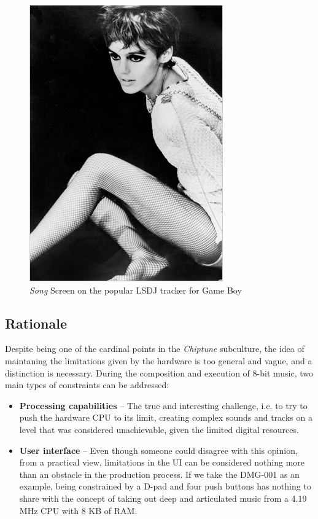 \documentclass[]{article}
\begin{document}
        \begin{figure}[h]
            \centering
            \includegraphics[width=.5\textwidth]{PLACEHOLDER.jpg} %
            \caption{\emph{Song} Screen on the popular LSDJ tracker for Game Boy \cite{KOTLINSKI2007}}
            \label{fig:lsdj}
        \end{figure}


    \subsection{Rationale}  %
            Despite being one of the cardinal points in the \emph{Chiptune} subculture, the idea of 
            maintaning the limitations given by the hardware is too general and vague, and a distinction is 
            necessary. During the composition and execution of 8-bit music, two main types of constraints can be addressed:

            \begin{itemize}
            \item \textbf{Processing capabilities} -- The true and interesting challenge, i.e. to try to push the 
                    hardware CPU to its limit, creating complex sounds and tracks on a level that was considered 
                    unachievable, given the limited digital resources.
            \item \textbf{User interface} -- Even though someone could disagree with this opinion, from a practical view, limitations in the UI
                    can be considered nothing more than an obstacle in the production process. If we take the DMG-001 as an example, being constrained
                    by a D-pad and four push buttons has nothing to share with the concept of taking out deep and articulated music from a 4.19 MHz CPU with 8 KB of RAM.
            \end{itemize}
\end{document}
